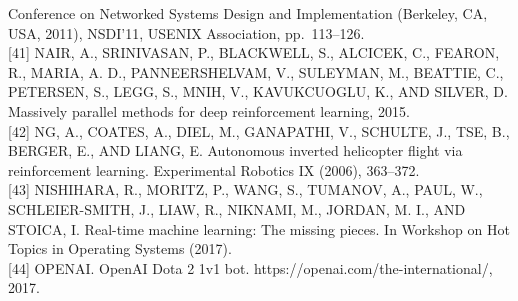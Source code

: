 \documentclass[
]{article}
\begin{document}
Conference on Networked Systems Design and Implementation (Berkeley, CA,
USA, 2011), NSDI'11, USENIX Association, pp.~113--126.\\
{[}41{]} NAIR, A., SRINIVASAN, P., BLACKWELL, S., ALCICEK, C., FEARON,
R., MARIA, A. D., PANNEERSHELVAM, V., SULEYMAN, M., BEATTIE, C.,
PETERSEN, S., LEGG, S., MNIH, V., KAVUKCUOGLU, K., AND SILVER, D.
Massively parallel methods for deep reinforcement learning, 2015.\\
{[}42{]} NG, A., COATES, A., DIEL, M., GANAPATHI, V., SCHULTE, J., TSE,
B., BERGER, E., AND LIANG, E. Autonomous inverted helicopter flight via
reinforcement learning. Experimental Robotics IX (2006), 363--372.\\
{[}43{]} NISHIHARA, R., MORITZ, P., WANG, S., TUMANOV, A., PAUL, W.,
SCHLEIER-SMITH, J., LIAW, R., NIKNAMI, M., JORDAN, M. I., AND STOICA, I.
Real-time machine learning: The missing pieces. In Workshop on Hot
Topics in Operating Systems (2017).\\
{[}44{]} OPENAI. OpenAI Dota 2 1v1 bot.
https://openai.com/the-international/, 2017.
\end{document}
